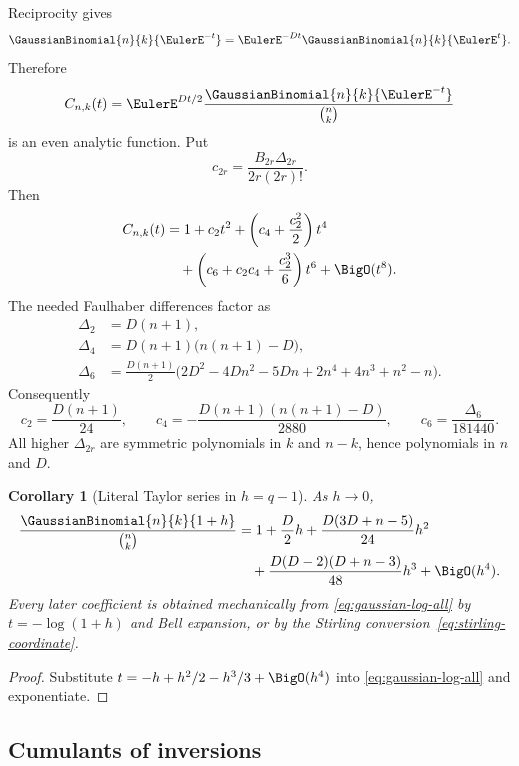 \documentclass[11pt,oneside]{article}
\newtheorem{corollary}[theorem]{Corollary}
\theoremstyle{definition}
\theoremstyle{remark}
\let\reportsubsection\subsection
\let\section\reportsubsection
\begin{document}
Reciprocity gives
\[
 \GaussianBinomial{n}{k}{\EulerE^{-t}}
 =\EulerE^{-Dt}\GaussianBinomial{n}{k}{\EulerE^{t}}.
\]
Therefore
\begin{equation}\label{eq:centered-gaussian}
 C_{n,k}(t)=
 \EulerE^{Dt/2}\frac{\GaussianBinomial{n}{k}{\EulerE^{-t}}}{\binom nk}
\end{equation}
is an even analytic function.  Put
\[
 c_{2r}=\frac{B_{2r}\Delta_{2r}}{2r(2r)!}.
\]
Then
\begin{align}
 C_{n,k}(t)
 &=1+c_2t^2+
   \left(c_4+\frac{c_2^2}{2}\right)t^4
 \notag\\
 &\quad+
   \left(c_6+c_2c_4+\frac{c_2^3}{6}\right)t^6
   +\BigO(t^8).                                      \label{eq:centered-through-six}
\end{align}
The needed Faulhaber differences factor as
\begin{align}
 \Delta_2&=D(n+1),\label{eq:delta2}\\
 \Delta_4&=D(n+1)\bigl(n(n+1)-D\bigr),\label{eq:delta4}\\
 \Delta_6&=\frac{D(n+1)}2
 \bigl(2D^2-4Dn^2-5Dn+2n^4+4n^3+n^2-n\bigr).
 \label{eq:delta6}
\end{align}
Consequently
\[
 c_2=\frac{D(n+1)}{24},
 \qquad
 c_4=-\frac{D(n+1)(n(n+1)-D)}{2880},
 \qquad
 c_6=\frac{\Delta_6}{181440}.
\]
All higher $\Delta_{2r}$ are symmetric polynomials in $k$ and $n-k$, hence
polynomials in $n$ and $D$.

\begin{corollary}[Literal Taylor series in $h=q-1$]\label{cor:qminusone-coordinate}
As $h\to0$,
\begin{align}
 \frac{\GaussianBinomial{n}{k}{1+h}}{\binom nk}
 &=1+\frac D2h+
 \frac{D(3D+n-5)}{24}h^2
 \notag\\
 &\quad+
 \frac{D(D-2)(D+n-3)}{48}h^3+\BigO(h^4).
 \label{eq:gaussian-h-first}
\end{align}
Every later coefficient is obtained mechanically from
\eqref{eq:gaussian-log-all} by $t=-\log(1+h)$ and Bell expansion, or by the
Stirling conversion~\eqref{eq:stirling-coordinate}.
\end{corollary}

\begin{proof}
Substitute
$t=-h+h^2/2-h^3/3+\BigO(h^4)$ into
\eqref{eq:gaussian-log-all} and exponentiate.
\end{proof}

\section{Cumulants of inversions}
\end{document}
